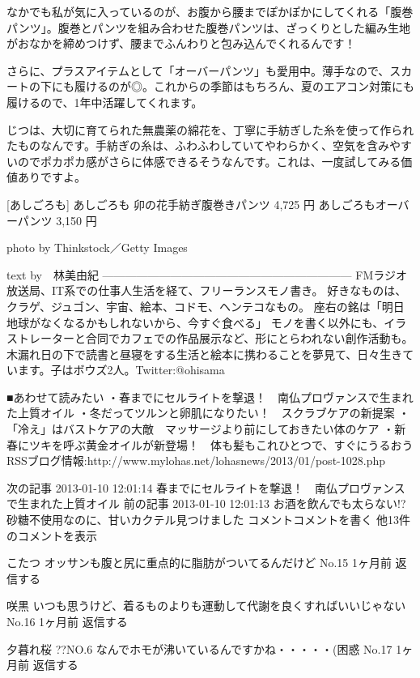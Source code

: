 なかでも私が気に入っているのが、お腹から腰までぽかぽかにしてくれる「腹巻パンツ」。腹巻とパンツを組み合わせた腹巻パンツは、ざっくりとした編み生地がおなかを締めつけず、腰までふんわりと包み込んでくれるんです！



さらに、プラスアイテムとして「オーバーパンツ」も愛用中。薄手なので、スカートの下にも履けるのが◎。これからの季節はもちろん、夏のエアコン対策にも履けるので、1年中活躍してくれます。

じつは、大切に育てられた無農薬の綿花を、丁寧に手紡ぎした糸を使って作られたものなんです。手紡ぎの糸は、ふわふわしていてやわらかく、空気を含みやすいのでポカポカ感がさらに体感できるそうなんです。これは、一度試してみる価値ありですよ。

[あしごろも]
あしごろも 卯の花手紡ぎ腹巻きパンツ
4,725 円
あしごろもオーバーパンツ
3,150 円

photo by Thinkstock／Getty Images

text by　林美由紀
------------------------------------------------------------------
FMラジオ放送局、IT系での仕事人生活を経て、フリーランスモノ書き。
好きなものは、クラゲ、ジュゴン、宇宙、絵本、コドモ、ヘンテコなもの。 
座右の銘は「明日地球がなくなるかもしれないから、今すぐ食べる」
モノを書く以外にも、イラストレーターと合同でカフェでの作品展示など、形にとらわれない創作活動も。
木漏れ日の下で読書と昼寝をする生活と絵本に携わることを夢見て、日々生きています。子はボウズ2人。Twitter:@ohisama


■あわせて読みたい
・春までにセルライトを撃退！　南仏プロヴァンスで生まれた上質オイル
・冬だってツルンと卵肌になりたい！　スクラブケアの新提案
・「冷え」はバストケアの大敵　マッサージより前にしておきたい体のケア
・新春にツキを呼ぶ黄金オイルが新登場！　体も髪もこれひとつで、すぐにうるおう
RSSブログ情報:http://www.mylohas.net/lohasnews/2013/01/post-1028.php


 
 

次の記事
2013-01-10 12:01:14
春までにセルライトを撃退！　南仏プロヴァンスで生まれた上質オイル
前の記事
2013-01-10 12:01:13
お酒を飲んでも太らない!?　砂糖不使用なのに、甘いカクテル見つけました
コメントコメントを書く
他13件のコメントを表示
 
こたつ 
オッサンも腹と尻に重点的に脂肪がついてるんだけど 
No.15
1ヶ月前
返信する
 
咲黒 
いつも思うけど、着るものよりも運動して代謝を良くすればいいじゃない 
No.16
1ヶ月前
返信する
 
夕暮れ桜 
??NO.6
なんでホモが沸いているんですかね・・・・・(困惑 
No.17
1ヶ月前
返信する
 
